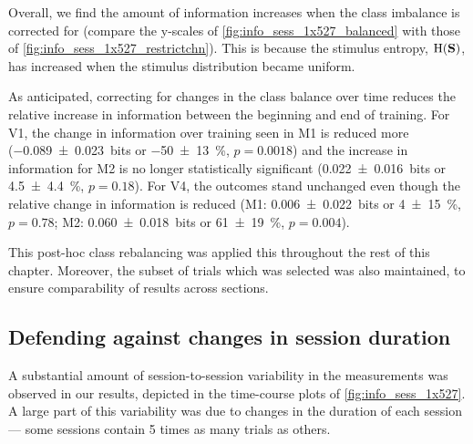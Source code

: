 Overall, we find the amount of information increases when the class imbalance is corrected for (compare the y-scales of \autoref{fig:info_sess_1x527_balanced} with those of \autoref{fig:info_sess_1x527_restrictchn}).
This is because the stimulus entropy, $\operatorname{H}(\mathbf{S})$, has increased when the stimulus distribution became uniform.

As anticipated, correcting for changes in the class balance over time reduces the relative increase in information between the beginning and end of training.
For \ac{V1}, the change in information over training seen in \ac{M1} is reduced more (\SI{-0.089\pm0.023}{bits} or \SI{-50\pm13}{\percent}, $p=0.0018$) and the increase in information for \ac{M2} is no longer statistically significant (\SI{+0.022\pm0.016}{bits} or \SI{+4.5\pm4.4}{\percent}, $p=0.18$).
For \ac{V4}, the outcomes stand unchanged even though the relative change in information is reduced
(\ac{M1}: \SI{+0.006\pm0.022}{bits} or \SI{+4\pm15}{\percent}, $p=0.78$; \ac{M2}: \SI{+0.060\pm0.018}{bits} or \SI{+61\pm19}{\percent}, $p=0.004$).

This post-hoc class rebalancing was applied this throughout the rest of this chapter.
Moreover, the subset of trials which was selected was also maintained, to ensure comparability of results across sections.


\subsection{Defending against changes in session duration}

A substantial amount of session-to-session variability in the measurements was observed in our results, depicted in the time-course plots of \autoref{fig:info_sess_1x527}.
A large part of this variability was due to changes in the duration of each session --- some sessions contain \num{5} times as many trials as others.

